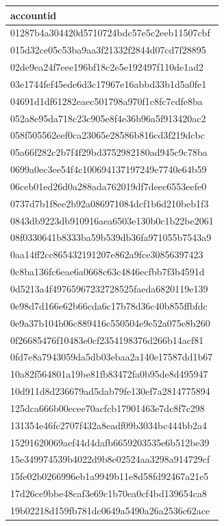 \begin{tabular}{l}
\toprule
accountid \\
\midrule
01287b4a304420d5710724bdc57e5c2eeb11507cbf \\
015d32ce05c53ba9aa3f21332f2844d07cd7f28895 \\
02de9ea24f7eee196bf18c2e5e192497f110de1ad2 \\
03e1744fef45ede6d3c17967e16abbd33b1d5a0fe1 \\
04691d1df61282eaec501798a970f1c8fc7cdfe8ba \\
052a8e95da718c23c905e8f4e36b96a5f913420ac2 \\
058f505562eef0ca23065e28586b816cd3f219dcbc \\
05a66f282c2b7f4f29bd3752982180ad945c9c78ba \\
0699a0ec3ee54f4c100694137197249e7740e64b59 \\
06ceb01ed26d0a288ada762019df7deec6553eefe0 \\
0737d7b1f8ee2b92a086971084dcf1b6d210beb1f3 \\
0843db9223db910916aea6503e130b0c1b22be2061 \\
08f0330641b8333ba59b539db36fa971055b7543a9 \\
0aa14ff2cc865432191207e862a9fce30856397423 \\
0c8ba136fc6eae6a0668c63c4846ecfbb7f3b4591d \\
0d5213a4f49765967232728525faeda6820119e139 \\
0e98d7d166e62b66cda6c17b78d36c40b855ffbfdc \\
0e9a37b104b06c889416c550504e9e52a075e8b260 \\
0f26685476f10483e0cf2354198376d266b14acf81 \\
0fd7e8a7943059da5db03ebaa2a140e17587dd1b67 \\
10a82f564801a19be81fb83472fa0b95de8d495947 \\
10d911d8d236679ad5dab79fe130ef7a2814775894 \\
125dca666b00ecee70acfcb17901463e7dc8f7c298 \\
131354e46fc2707f432a8eadf09b3034bc444bb2a4 \\
15291620069aef44d4dafb6659203535e6b512be39 \\
15e349974539b4022d9b8e02524aa3298a914729cf \\
15fe02b0266996eb1a9949b11e8d58fd92467a21e5 \\
17d26ce9bbe48caf3e69c1b70ea0cf4bd139654ca8 \\
19b02218d159fb781dc0649a5490a26a2536c62ace \\

\end{tabular}
